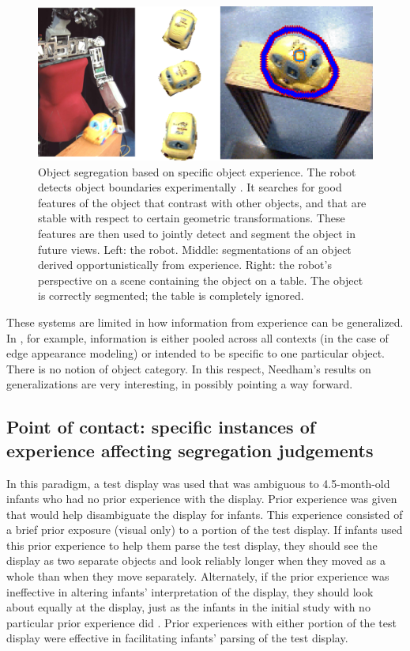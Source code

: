 \begin{figure}[t]

\centerline{
\includegraphics[width=0.75\columnwidth]{fig-robot}
}

\caption{
%
Object segregation based on specific object experience.  The robot
detects object boundaries experimentally \cite{fitzpatrick03object}.
It searches for good features of the object that contrast with other
objects, and that are stable with respect to certain geometric
transformations.  These features are then used to jointly detect
and segment the object in future views.  Left: the robot.
Middle: segmentations of an object derived opportunistically
from experience.  Right: the robot's perspective on a scene 
containing the object on a table.  The object is correctly segmented;
the table is completely ignored.
%
}

\label{fig:robot}

\end{figure}



These systems are limited in how information from experience can be
generalized.  In , for example,
information is either pooled across all contexts (in the case of edge
appearance modeling) or intended to be specific to one particular
object.  There is no notion of object category.
%
In this respect, Needham's results on generalizations are
very interesting, in possibly pointing a way forward.



\subsection{Point of contact: specific instances of experience affecting segregation judgements}

In this paradigm, a test display was used that was ambiguous to
4.5-month-old infants who had no prior experience with the display.
Prior experience was given that would help disambiguate the display
for infants.  This experience consisted of a brief prior exposure
(visual only) to a portion of the test display.  If infants used this
prior experience to help them parse the test display, they should see
the display as two separate objects and look reliably longer when they
moved as a whole than when they move separately.  Alternately, if the
prior experience was ineffective in altering infants'
interpretation of the display, they should look about equally at the
display, just as the infants in the initial study with no particular
prior experience did \cite{needham98effects}.  Prior experiences
with either portion of the test display were effective in facilitating
infants' parsing of the test display.  

